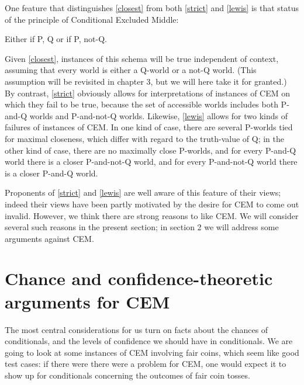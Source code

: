 \documentclass[If.tex]{subfiles}
\begin{document}
One feature that distinguishes \ref{closest} from both \ref{strict} and \ref{lewis} is
that status of the principle of Conditional Excluded Middle:
\begin{prop}
	\litem[CEM] \label{CEM}
	Either if P, Q or if P, not-Q.
\end{prop}
Given \ref{closest}, instances of this schema will be true independent of context, assuming that every world is either a Q-world or a not-Q world. (This assumption will be revisited in chapter 3, but we will here take it for granted.) By contrast, \ref{strict} obviously allows for interpretations of instances of CEM on which they fail to be true, because the set of accessible worlds includes both P-and-Q worlds and P-and-not-Q worlds. Likewise, \ref{lewis} allows for two kinds of failures of instances of CEM. In one kind of case, there are several P-worlds tied for maximal closeness, which differ with regard to the truth-value of Q; in the other kind of case, there are no maximally close P-worlds, and for every P-and-Q world there is a closer P-and-not-Q world, and for every P-and-not-Q world there is a closer P-and-Q world.

Proponents of \ref{strict} and \ref{lewis} are well aware of this feature of their views; indeed their views have been partly motivated by the desire for CEM to come out invalid. However, we think there are strong reasons to like CEM. We will consider several such reasons in the present section; in section 2 we will address some arguments against CEM.

\section{Chance and confidence-theoretic arguments for CEM}
The most central considerations for us turn on facts about the chances of conditionals, and the levels of confidence we should have in conditionals. We are going to look at some instances of CEM involving fair coins, which seem like good test cases: if there were there were a problem for CEM, one would expect it to show up for conditionals concerning the outcomes of fair coin tosses.
\end{document}

